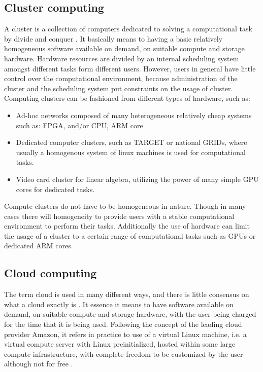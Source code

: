 \subsection{Cluster computing}
\label{subsect:ClusterComputing}
A cluster is a collection of computers dedicated to solving a computational task by divide 
and conquer \cite{Silva:1999, Qiu:2010}. It basically means to having a basic relatively 
homogeneous software available on demand, on suitable compute and storage hardware. Hardware 
resources are divided by an internal scheduling system amongst different tasks form different 
users. However, users in general have little control over the computational environment, 
because administration of the cluster and the scheduling system put constraints on the usage 
of cluster. Computing clusters can be fashioned from different types of hardware, such as:
\begin{itemize}
  \item Ad-hoc networks composed of many heterogeneous relatively cheap systems such as: FPGA, and/or CPU, ARM core
  \item Dedicated computer clusters, such as TARGET or national GRIDs, where usually a homogenous system of linux machines is used for computational tasks.
  \item Video card cluster for linear algebra, utilizing the power of many simple GPU cores for dedicated tasks.
\end{itemize}
Compute clusters do not have to be homogeneous in nature. Though in many cases there will 
homogeneity to provide users with a stable computational environment to perform their tasks. 
Additionally the use of hardware can limit the usage of a cluster to a certain range of 
computational tasks such as GPUs or dedicated ARM cores.

\subsection{Cloud computing}
\label{sect:CloudComputing}
The term cloud is used in many different ways, and there is little consensus on what a cloud 
exactly is \cite{Foster:2008}. It essence it means to have software available 
on demand, on suitable compute and storage hardware, with the user being charged for the time 
that it is being used. Following the concept of the leading cloud provider Amazon, it refers 
in practice to use of a virtual Linux machine, i.e. a virtual compute server with Linux 
preinitialized, hosted within some large compute infrastructure, with complete freedom to be 
customized by the user although not for free \cite{Trelles:2011}.


